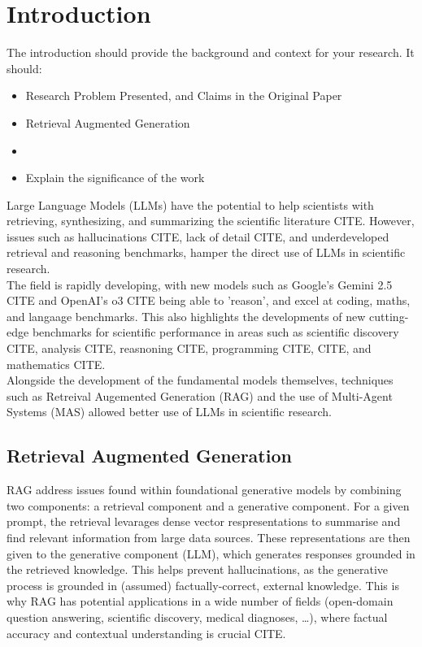 \section{Introduction}
\label{sec:introduction}
The introduction should provide the background and context for your research. It should:
\begin{itemize}
    \item Research Problem Presented, and Claims in the Original Paper
    \item Retrieval Augmented Generation
    \item 
    \item Explain the significance of the work
\end{itemize}

Large Language Models (LLMs) have the potential to help scientists with retrieving, synthesizing, and summarizing the scientific literature CITE. 
However, issues such as hallucinations CITE, lack of detail CITE, and underdeveloped retrieval and reasoning benchmarks, hamper the direct use of LLMs in scientific research. \\

The field is rapidly developing, with new models such as Google's Gemini 2.5 CITE and OpenAI's o3 CITE being able to 'reason', and excel at coding, maths, and langaage benchmarks. 
This also highlights the developments of new cutting-edge benchmarks for scientific performance in areas such as scientific discovery CITE, analysis CITE, reasnoning CITE, programming CITE,
CITE, and mathematics CITE. \\

Alongside the development of the fundamental models themselves, techniques such as Retreival Augemented Generation (RAG) and the use of Multi-Agent Systems (MAS) allowed better use of LLMs in scientific research. \\

\subsection{Retrieval Augmented Generation}
RAG address issues found within foundational generative models by combining two components: a retrieval component and a generative component. 
For a given prompt, the retrieval levarages dense vector respresentations to summarise and find relevant information from large data sources. 
These representations are then given to the generative component (LLM), which generates responses grounded in the retrieved knowledge. 
This helps prevent hallucinations, as the generative process is grounded in (assumed) factually-correct, external knowledge. 
This is why RAG has potential applications in a wide number of fields (open-domain question answering, scientific discovery, medical diagnoses, \dots), where factual accuracy and contextual understanding is crucial CITE.\\

